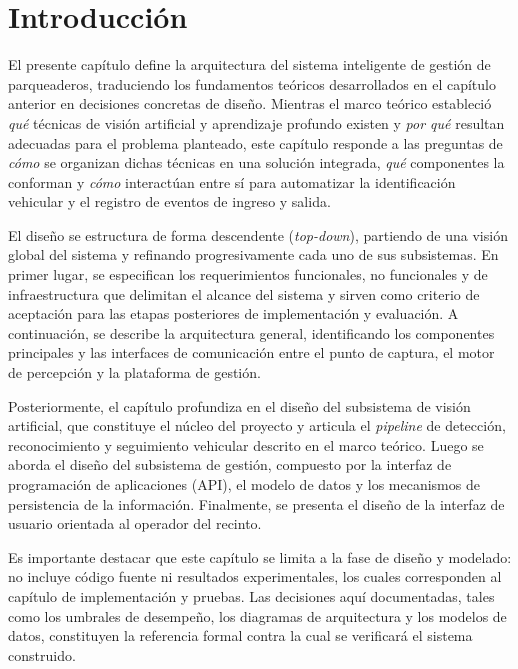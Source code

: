 \section{Introducción}

El presente capítulo define la arquitectura del sistema inteligente de gestión
de parqueaderos, traduciendo los fundamentos teóricos desarrollados en el
capítulo anterior en decisiones concretas de diseño. Mientras el marco teórico
estableció \textit{qué} técnicas de visión artificial y aprendizaje profundo
existen y \textit{por qué} resultan adecuadas para el problema planteado, este
capítulo responde a las preguntas de \textit{cómo} se organizan dichas técnicas
en una solución integrada, \textit{qué} componentes la conforman y \textit{cómo}
interactúan entre sí para automatizar la identificación vehicular y el registro
de eventos de ingreso y salida.

El diseño se estructura de forma descendente (\textit{top-down}), partiendo de
una visión global del sistema y refinando progresivamente cada uno de sus
subsistemas. En primer lugar, se especifican los requerimientos funcionales, no
funcionales y de infraestructura que delimitan el alcance del sistema y sirven
como criterio de aceptación para las etapas posteriores de implementación y
evaluación. A continuación, se describe la arquitectura general, identificando
los componentes principales y las interfaces de comunicación entre el punto de
captura, el motor de percepción y la plataforma de gestión.

Posteriormente, el capítulo profundiza en el diseño del subsistema de visión
artificial, que constituye el núcleo del proyecto y articula el \textit{pipeline}
de detección, reconocimiento y seguimiento vehicular descrito en el marco
teórico. Luego se aborda el diseño del subsistema de gestión, compuesto por la
interfaz de programación de aplicaciones (API), el modelo de datos y los
mecanismos de persistencia de la información. Finalmente, se presenta el diseño
de la interfaz de usuario orientada al operador del recinto.

Es importante destacar que este capítulo se limita a la fase de diseño y
modelado: no incluye código fuente ni resultados experimentales, los cuales
corresponden al capítulo de implementación y pruebas. Las decisiones aquí
documentadas, tales como los umbrales de desempeño, los diagramas de
arquitectura y los modelos de datos, constituyen la referencia formal contra la
cual se verificará el sistema construido.
